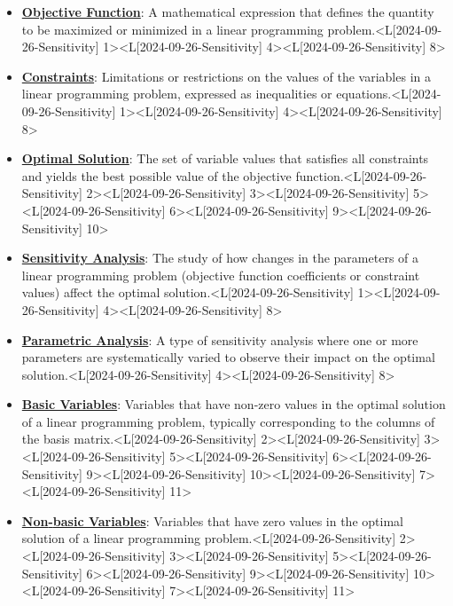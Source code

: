 \documentclass{article}%
\begin{document}
\begin{itemize}[[leftmargin=*]]%
\item \href{https://www.math.purdue.edu/~yipn/421/2024-09-26-Sensitivity.pdf#page=1}{\textbf{Objective Function}}: A mathematical expression that defines the quantity to be maximized or minimized in a linear programming problem.<L[2024-09-26-Sensitivity] 1><L[2024-09-26-Sensitivity] 4><L[2024-09-26-Sensitivity] 8>%
\item \href{https://www.math.purdue.edu/~yipn/421/2024-09-26-Sensitivity.pdf#page=1}{\textbf{Constraints}}: Limitations or restrictions on the values of the variables in a linear programming problem, expressed as inequalities or equations.<L[2024-09-26-Sensitivity] 1><L[2024-09-26-Sensitivity] 4><L[2024-09-26-Sensitivity] 8>%
\item \href{https://www.math.purdue.edu/~yipn/421/2024-09-26-Sensitivity.pdf#page=2}{\textbf{Optimal Solution}}: The set of variable values that satisfies all constraints and yields the best possible value of the objective function.<L[2024-09-26-Sensitivity] 2><L[2024-09-26-Sensitivity] 3><L[2024-09-26-Sensitivity] 5><L[2024-09-26-Sensitivity] 6><L[2024-09-26-Sensitivity] 9><L[2024-09-26-Sensitivity] 10>%
\item \href{https://www.math.purdue.edu/~yipn/421/2024-09-26-Sensitivity.pdf#page=1}{\textbf{Sensitivity Analysis}}: The study of how changes in the parameters of a linear programming problem (objective function coefficients or constraint values) affect the optimal solution.<L[2024-09-26-Sensitivity] 1><L[2024-09-26-Sensitivity] 4><L[2024-09-26-Sensitivity] 8>%
\item \href{https://www.math.purdue.edu/~yipn/421/2024-09-26-Sensitivity.pdf#page=4}{\textbf{Parametric Analysis}}: A type of sensitivity analysis where one or more parameters are systematically varied to observe their impact on the optimal solution.<L[2024-09-26-Sensitivity] 4><L[2024-09-26-Sensitivity] 8>%
\item \href{https://www.math.purdue.edu/~yipn/421/2024-09-26-Sensitivity.pdf#page=2}{\textbf{Basic Variables}}: Variables that have non-zero values in the optimal solution of a linear programming problem, typically corresponding to the columns of the basis matrix.<L[2024-09-26-Sensitivity] 2><L[2024-09-26-Sensitivity] 3><L[2024-09-26-Sensitivity] 5><L[2024-09-26-Sensitivity] 6><L[2024-09-26-Sensitivity] 9><L[2024-09-26-Sensitivity] 10><L[2024-09-26-Sensitivity] 7><L[2024-09-26-Sensitivity] 11>%
\item \href{https://www.math.purdue.edu/~yipn/421/2024-09-26-Sensitivity.pdf#page=2}{\textbf{Non{-}basic Variables}}: Variables that have zero values in the optimal solution of a linear programming problem.<L[2024-09-26-Sensitivity] 2><L[2024-09-26-Sensitivity] 3><L[2024-09-26-Sensitivity] 5><L[2024-09-26-Sensitivity] 6><L[2024-09-26-Sensitivity] 9><L[2024-09-26-Sensitivity] 10><L[2024-09-26-Sensitivity] 7><L[2024-09-26-Sensitivity] 11>%

\end{itemize}
\end{document}
